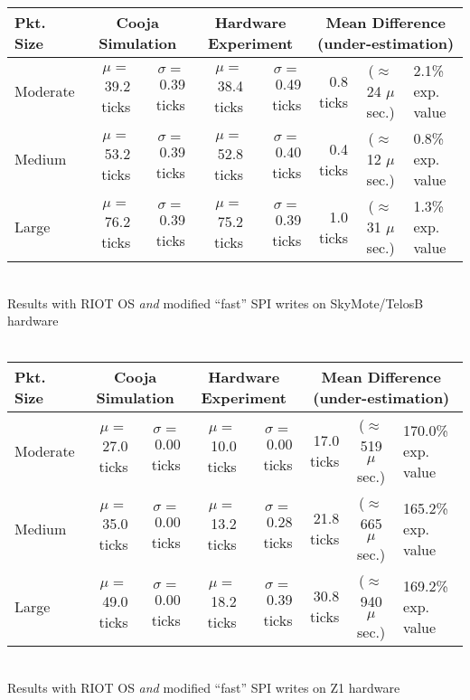 \documentclass[a4paper,10pt]{article}
\begin{document}
\begin{sidewaystable}[!p]
\centering

\newcommand{\ticks}[1]{#1 ticks}
\newcommand{\moy}[1]{$\mu=$ \ticks{#1}}
\newcommand{\ect}[1]{$\sigma=$ \ticks{#1}}
\newcommand{\estus}[1]{($\approx$ #1 $\mu$sec.)}
\newcommand{\prctv}[1]{#1\% exp. value}

\begin{tabular}{|l|rr|rr|rcl|}
\hline
Pkt. Size & \multicolumn{2}{c|}{Cooja Simulation}
          & \multicolumn{2}{c|}{Hardware Experiment}
          & \multicolumn{3}{c|}{Mean Difference (under-estimation)} \\
\hline
 Moderate & \moy{39.2} & \ect{0.39} & \moy{38.4} & \ect{0.49}
          & 0.8 ticks & \estus{24} & \prctv{2.1} \\
 Medium   & \moy{53.2} & \ect{0.39} & \moy{52.8} & \ect{0.40}
          & 0.4 ticks & \estus{12} & \prctv{0.8} \\
 Large    & \moy{76.2} & \ect{0.39} & \moy{75.2} & \ect{0.39}
          & 1.0 ticks & \estus{31} & \prctv{1.3} \\
\hline
\end{tabular}
\\
Results with RIOT OS \emph{and} modified ``fast'' SPI writes
on SkyMote/TelosB hardware\\
\ \\

\begin{tabular}{|l|rr|rr|rcl|}
\hline
Pkt. Size & \multicolumn{2}{c|}{Cooja Simulation}
          & \multicolumn{2}{c|}{Hardware Experiment}
          & \multicolumn{3}{c|}{Mean Difference (under-estimation)} \\
\hline
 Moderate & \moy{27.0} & \ect{0.00} & \moy{10.0} & \ect{0.00}
          & 17.0 ticks & \estus{519} & \prctv{170.0} \\
 Medium   & \moy{35.0} & \ect{0.00} & \moy{13.2} & \ect{0.28}
          & 21.8 ticks & \estus{665} & \prctv{165.2} \\
 Large    & \moy{49.0} & \ect{0.00} & \moy{18.2} & \ect{0.39}
          & 30.8 ticks & \estus{940} & \prctv{169.2} \\
\hline
\end{tabular}
\\
Results with RIOT OS \emph{and} modified ``fast'' SPI writes
on Z1 hardware\\
\ \\

\caption{Delays observed for loading packets into CC2420 TX buffer,
using RIOT OS with a modified SPI driver based upon the ``fast write'' model.}
\label{TblDelaysModifDrivers}
\end{sidewaystable}
\end{document}
